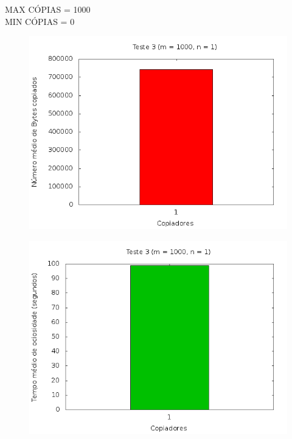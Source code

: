 \documentclass[12pt,a4paper]{article}
\begin{document}
MAX CÓPIAS = 1000
\\
MIN CÓPIAS = 0

\begin{center}
\begin{figure}[H]
    \center
    \includegraphics[scale=0.5]{imagens/grafico_bytes3.png}
    \label{teste3_bytes}
\end{figure}

\end{center}
\begin{center}
\begin{figure}[H]
    \center
    \includegraphics[scale=0.5]{imagens/grafico_ociosidade3.png}
    \label{teste3_ociosidade}
\end{figure}
\end{center}
\end{document}
